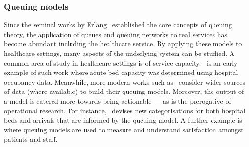 \documentclass[11pt]{article}
\begin{document}
\subsubsection{Queuing models}

Since the seminal works by Erlang~\cite{Erlang1917,Erlang1920} established
the core concepts of queuing theory, the application of queues and queuing
networks to real services has become abundant including the healthcare service.
By applying these models to healthcare settings, many aspects of the underlying
system can be studied. A common area of study in healthcare settings is of
service capacity.~\cite{McClain1976} is an early example of such work where
acute bed capacity was determined using hospital occupancy data. Meanwhile, more
modern works such as~\cite{Palvannan2012,Pinto2014} consider wider sources of
data (where available) to build their queuing models. Moreover, the output of
a model is catered more towards being actionable --- as is the prerogative of
operational research. For instance,~\cite{Pinto2014} devises new categorisations
for both hospital beds and arrivals that are informed by the queuing model.
A further example is~\cite{Komashie2015} where queuing models are used to
measure and understand satisfaction amongst patients and staff.
\end{document}
